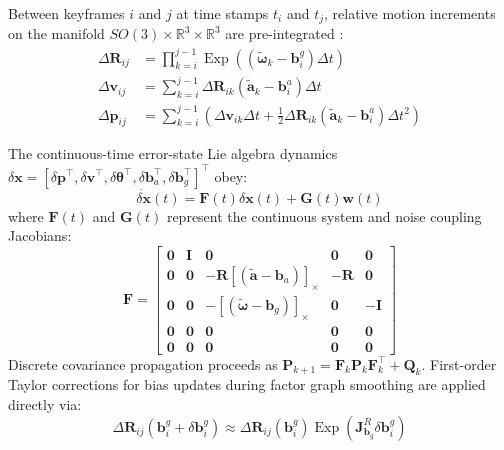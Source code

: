 \documentclass[journal]{IEEEtran}
\begin{document}
Between keyframes $i$ and $j$ at time stamps $t_i$ and $t_j$, relative motion increments on the manifold $SO(3) \times \mathbb{R}^3 \times \mathbb{R}^3$ are pre-integrated \cite{forster2016manifold}:
\begin{align}
\Delta \mathbf{R}_{ij} &= \prod_{k=i}^{j-1} \operatorname{Exp}\left((\tilde{\boldsymbol{\omega}}_k - \mathbf{b}_i^g) \Delta t\right) \\
\Delta \mathbf{v}_{ij} &= \sum_{k=i}^{j-1} \Delta \mathbf{R}_{ik} (\tilde{\mathbf{a}}_k - \mathbf{b}_i^a) \Delta t \\
\Delta \mathbf{p}_{ij} &= \sum_{k=i}^{j-1} \left( \Delta \mathbf{v}_{ik} \Delta t + \frac{1}{2} \Delta \mathbf{R}_{ik} (\tilde{\mathbf{a}}_k - \mathbf{b}_i^a) \Delta t^2 \right)
\end{align}

The continuous-time error-state Lie algebra dynamics $\delta \mathbf{x} = [\delta \mathbf{p}^\top, \delta \mathbf{v}^\top, \delta \boldsymbol{\theta}^\top, \delta \mathbf{b}_a^\top, \delta \mathbf{b}_g^\top]^\top$ obey:
\begin{equation}
\dot{\delta \mathbf{x}}(t) = \mathbf{F}(t) \delta \mathbf{x}(t) + \mathbf{G}(t) \mathbf{w}(t)
\end{equation}
where $\mathbf{F}(t)$ and $\mathbf{G}(t)$ represent the continuous system and noise coupling Jacobians:
\begin{equation}
\mathbf{F} = \begin{bmatrix}
\mathbf{0} & \mathbf{I} & \mathbf{0} & \mathbf{0} & \mathbf{0} \\
\mathbf{0} & \mathbf{0} & -\mathbf{R} [(\tilde{\mathbf{a}} - \mathbf{b}_a)]_\times & -\mathbf{R} & \mathbf{0} \\
\mathbf{0} & \mathbf{0} & -[(\tilde{\boldsymbol{\omega}} - \mathbf{b}_g)]_\times & \mathbf{0} & -\mathbf{I} \\
\mathbf{0} & \mathbf{0} & \mathbf{0} & \mathbf{0} & \mathbf{0} \\
\mathbf{0} & \mathbf{0} & \mathbf{0} & \mathbf{0} & \mathbf{0}
\end{bmatrix}
\end{equation}
Discrete covariance propagation proceeds as $\mathbf{P}_{k+1} = \mathbf{F}_k \mathbf{P}_k \mathbf{F}_k^\top + \mathbf{Q}_k$. First-order Taylor corrections for bias updates during factor graph smoothing are applied directly via:
\begin{equation}
\Delta \mathbf{R}_{ij}(\mathbf{b}_i^g + \delta \mathbf{b}_i^g) \approx \Delta \mathbf{R}_{ij}(\mathbf{b}_i^g) \operatorname{Exp}\left( \mathbf{J}_{\mathbf{b}_g}^R \delta \mathbf{b}_i^g \right)
\end{equation}
\end{document}
